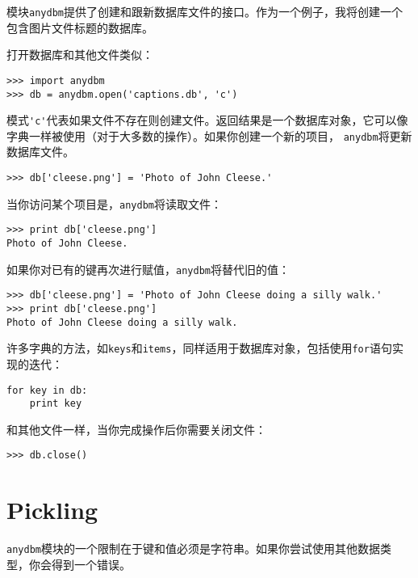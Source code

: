 模块{\tt anydbm}提供了创建和跟新数据库文件的接口。作为一个例子，我将创建一个包含图片文件标题的数据库。


打开数据库和其他文件类似：

\beforeverb
\begin{verbatim}
>>> import anydbm
>>> db = anydbm.open('captions.db', 'c')
\end{verbatim}
\afterverb
%
模式\verb"'c'"代表如果文件不存在则创建文件。返回结果是一个数据库对象，它可以像字典一样被使用（对于大多数的操作）。如果你创建一个新的项目， {\tt anydbm}将更新数据库文件。



\beforeverb
\begin{verbatim}
>>> db['cleese.png'] = 'Photo of John Cleese.'
\end{verbatim}
\afterverb
%
当你访问某个项目是，{\tt anydbm}将读取文件：

\beforeverb
\begin{verbatim}
>>> print db['cleese.png']
Photo of John Cleese.
\end{verbatim}
\afterverb
%
如果你对已有的键再次进行赋值，{\tt anydbm}将替代旧的值：

\beforeverb
\begin{verbatim}
>>> db['cleese.png'] = 'Photo of John Cleese doing a silly walk.'
>>> print db['cleese.png']
Photo of John Cleese doing a silly walk.
\end{verbatim}
\afterverb
%
许多字典的方法，如{\tt keys}和{\tt items}，同样适用于数据库对象，包括使用{\tt for}语句实现的迭代：


\beforeverb
\begin{verbatim}
for key in db:
    print key
\end{verbatim}
\afterverb
%
和其他文件一样，当你完成操作后你需要关闭文件：

\beforeverb
\begin{verbatim}
>>> db.close()
\end{verbatim}
\afterverb
%



\section{Pickling}


{\tt anydbm}模块的一个限制在于键和值必须是字符串。如果你尝试使用其他数据类型，你会得到一个错误。

